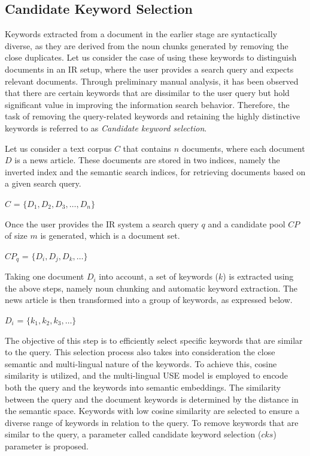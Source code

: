 \subsection{Candidate Keyword Selection}


Keywords extracted from a document in the earlier stage are syntactically diverse, as they are derived from the noun chunks generated by removing the close duplicates. Let us consider the case of using these keywords to distinguish documents in an \ac{IR} setup, where the user provides a search query and expects relevant documents. Through preliminary manual analysis, it has been observed that there are certain keywords that are dissimilar to the user query but hold significant value in improving the information search behavior. Therefore, the task of removing the query-related keywords and retaining the highly distinctive keywords is referred to as \emph{Candidate keyword selection}.


Let us consider a text corpus $C$ that contains $n$ documents, where each document $D$ is a news article. These documents are stored in two indices, namely the inverted index and the semantic search indices, for retrieving documents based on a given search query.


\centerline{$C$ = $\{D_1, D_2, D_3,\dots, D_n\}$}

Once the user provides the IR system a search query $q$ and a candidate pool $CP$ of size $m$ is generated, which is a document set.

\centerline{$CP_q$ = $\{D_i, D_j, D_k,\dots\}$}


Taking one document $D_i$ into account, a set of keywords ($k$) is extracted using the above steps, namely noun chunking and automatic keyword extraction. The news article is then transformed into a group of keywords, as expressed below.


\centerline{$D_i$ = $\{k_1, k_2, k_3,\dots\}$ } 

The objective of this step is to efficiently select specific keywords that are similar to the query. This selection process also takes into consideration the close semantic and multi-lingual nature of the keywords. To achieve this, cosine similarity is utilized, and the multi-lingual \ac{USE} model is employed to encode both the query and the keywords into semantic embeddings. The similarity between the query and the document keywords is determined by the distance in the semantic space. Keywords with low cosine similarity are selected to ensure a diverse range of keywords in relation to the query. To remove keywords that are similar to the query, a parameter called candidate keyword selection ($cks$) parameter is proposed.


